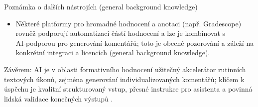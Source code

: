 Poznámka o dalších nástrojích (general background knowledge)
\begin{itemize}
  \item Některé platformy pro hromadné hodnocení a anotaci (např. Gradescope) rovněž podporují automatizaci částí hodnocení a lze je kombinovat s AI‑podporou pro generování komentářů; toto je obecné pozorování a záleží na konkrétní integraci a licencích (general background knowledge).
\end{itemize}

Závěrem: AI je v oblasti formativního hodnocení užitečný akcelerátor rutinních textových úkonů, zejména generování individualizovaných komentářů; klíčem k úspěchu je kvalitní strukturovaný vstup, přesné instrukce pro asistenta a povinná lidská validace konečných výstupů \cite{kb_ai_101_tipu_pdf_04e4a115_page_21_2,kb_ai_101_tipu_pdf_04e4a115_page_8_1}.